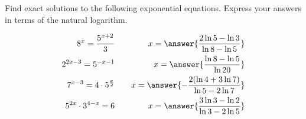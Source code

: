 \documentclass{ximera}
\author{Nela Lakos \and Kyle Parsons}
\begin{document}
\begin{exercise}

Find exact solutions to the following exponential equations.  Express your answers in terms of the natural logarithm.

\begin{align*}
8^x=\frac{5^{x+2}}{3} & \quad & x=\answer{\frac{2\ln{5} - \ln{3}}{\ln{8} - \ln{5}}}\\
2^{2x-3}=5^{-x-1} && x=\answer{\frac{\ln{8} - \ln{5}}{\ln{20}}}\\
7^{x-3}=4\cdot5^{\frac{x}{2}} && x=\answer{-\frac{2(\ln{4} + 3\ln{7})}{\ln{5} - 2\ln{7}}}\\
5^{2x}\cdot3^{4-x}=6 && x=\answer{\frac{3\ln{3} - \ln{2}}{\ln{3} - 2\ln{5}}}
\end{align*}

\end{exercise}
\end{document}

